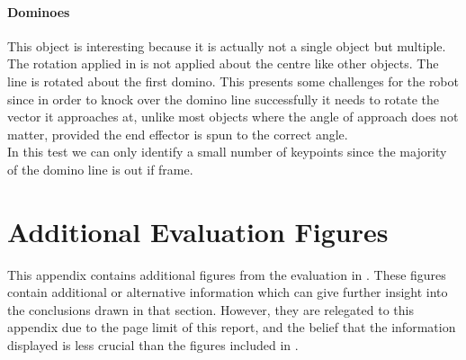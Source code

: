 \subsubsection{Dominoes}
This object is interesting because it is actually not a single object but multiple. The rotation applied in  is not applied about the centre like other objects. The line is rotated about the first domino. This presents some challenges for the robot since in order to knock over the domino line successfully it needs to rotate the vector it approaches at, unlike most objects where the angle of approach does not matter, provided the end effector is spun to the correct angle.\\

In this test we can only identify a small number of keypoints since the majority of the domino line is out if frame.


\chapter{Additional Evaluation Figures}
\label{apx:more-figures}

This appendix contains additional figures from the evaluation in . These figures contain additional or alternative information which can give further insight into the conclusions drawn in that section. However, they are relegated to this appendix due to the page limit of this report, and the belief that the information displayed is less crucial than the figures included in .\\
